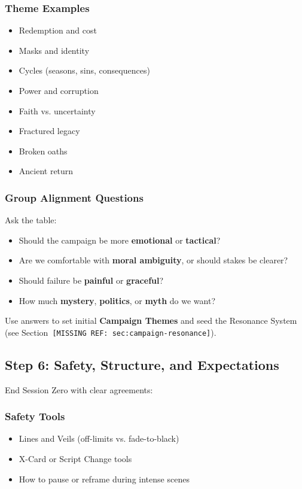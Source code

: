 \documentclass[11pt]{article}
\begin{document}
\subsubsection{Theme Examples}
\begin{itemize}
    \item Redemption and cost
    \item Masks and identity
    \item Cycles (seasons, sins, consequences)
    \item Power and corruption
    \item Faith vs. uncertainty
    \item Fractured legacy
    \item Broken oaths
    \item Ancient return
\end{itemize}

\subsubsection{Group Alignment Questions}
Ask the table:

\begin{itemize}
    \item Should the campaign be more \textbf{emotional} or \textbf{tactical}?
    \item Are we comfortable with \textbf{moral ambiguity}, or should stakes be clearer?
    \item Should failure be \textbf{painful} or \textbf{graceful}?
    \item How much \textbf{mystery}, \textbf{politics}, or \textbf{myth} do we want?
\end{itemize}

Use answers to set initial \textbf{Campaign Themes} and seed the Resonance System (see Section~\texttt{[MISSING REF: sec:campaign-resonance]}).

\subsection{Step 6: Safety, Structure, and Expectations}

End Session Zero with clear agreements:

\subsubsection{Safety Tools}
\begin{itemize}
    \item Lines and Veils (off-limits vs. fade-to-black)
    \item X-Card or Script Change tools
    \item How to pause or reframe during intense scenes
\end{itemize}
\end{document}
